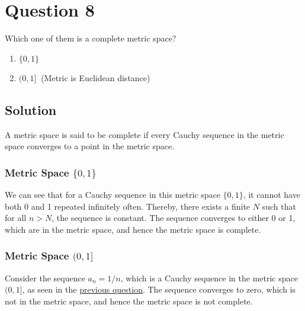 \section*{Question 8}

Which one of them is a complete metric space?
\begin{enumerate}[noitemsep, nolistsep, label= (\alph*)]
    \item \( \{ 0,1 \} \)
    \item \( ( 0,1 ] \ \) (Metric is Euclidean distance)
\end{enumerate}

\subsection*{Solution}

A metric space is said to be complete if every Cauchy sequence in the metric space converges to a point in the metric space.

\subsubsection*{Metric Space \( \{ 0,1 \} \)}

We can see that for a Cauchy sequence in this metric space \( \{ 0,1 \} \), it cannot have both 0 and 1 repeated infinitely often.
Thereby, there exists a finite \( N \) such that for all \( n > N \), the sequence is constant.
The sequence converges to either 0 or 1, which are in the metric space, and hence the metric space is complete.

\subsubsection*{Metric Space \( ( 0,1 ] \)}

Consider the sequence \( a_n = 1/n \), which is a Cauchy sequence in the metric space \( ( 0,1 ] \), as seen in the \hyperref[sec:q7]{previous question}.
The sequence converges to zero, which is not in the metric space, and hence the metric space is not complete.
